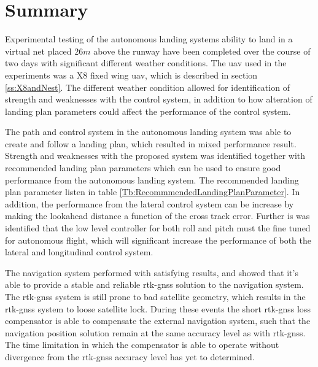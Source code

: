 \section{Summary}
Experimental testing of the autonomous landing systems ability to land in a virtual net placed $26 m $ above the runway have been completed over the course of two days with significant different weather conditions. The \gls{uav} used in the experiments was a X8 fixed wing \gls{uav}, which is described in section \ref{ss:X8andNest}. The different weather condition allowed for identification of strength and weaknesses with the control system, in addition to how alteration of landing plan parameters could affect the performance of the control system.

The path and control system in the autonomous landing system was able to create and follow a landing plan, which resulted in mixed performance result. Strength and weaknesses with the proposed system was identified together with recommended landing plan parameters which can be used to ensure good performance from the autonomous landing system. The recommended landing plan parameter listen in table \ref{Tb:RecommmendedLandingPlanParameter}. In addition, the performance from the lateral control system can be increase by making the lookahead distance a function of the cross track error. Further is was identified that the low level controller for both roll and pitch must the fine tuned for autonomous flight, which will significant increase the performance of both the lateral and longitudinal control system.

The navigation system performed with satisfying results, and showed that it's able to provide a stable and reliable \gls{rtk-gnss} solution to the navigation system. The \gls{rtk-gnss} system is still prone to bad satellite geometry, which results in the \gls{rtk-gnss} system to loose satellite lock. During these events the short \gls{rtk-gnss} loss compensator is able to compensate the external navigation system, such that the navigation position solution remain at the same accuracy level as with \gls{rtk-gnss}. The time limitation in which the compensator is able to operate without divergence from the \gls{rtk-gnss} accuracy level has yet to determined.